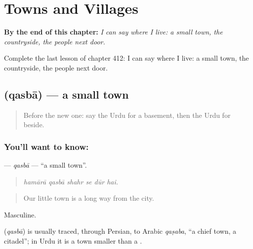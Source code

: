 
\chapter{Towns and Villages}
\label{ch:ur-towns-and-villages}

\begin{chapteropening}
\textbf{By the end of this chapter:} \emph{I can say where I live: a small town, the countryside, the people next door.}

Complete the last lesson of chapter 412: I can say where I live: a small town, the countryside, the people next door.
\end{chapteropening}

\section[\texorpdfstring{\ur{قصبہ} (qasbā)}{قصبہ (qasbā)}]{ (qasbā) — a small town}

\label{lesson:UR-C412-qasba}



\begin{quote}
Before the new one: say the Urdu for a basement, then the Urdu for beside.
\end{quote}

\subsection*{You'll want to know: }
\textbf{} — \emph{qasbā} — \textquotedblleft{}a small town\textquotedblright{}.

\begin{quote}
     
\end{quote}

\begin{quote}
\emph{hamārā qasbā shahr se dūr hai.}
\end{quote}

\begin{quote}
Our little town is a long way from the city.
\end{quote}

Masculine.

\begin{cousinweb}
\textbf{} (\emph{qasbā}) is usually traced, through Persian, to Arabic \emph{qaṣaba}, \textquotedblleft{}a chief town, a citadel\textquotedblright{}; in Urdu it is a town smaller than a \textbf{}.
\end{cousinweb}

